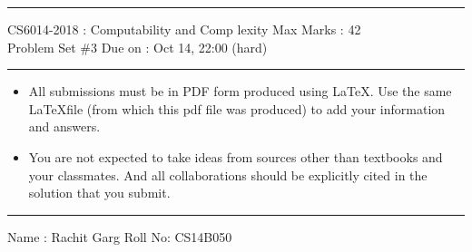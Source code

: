 \documentclass[solution,addpoints,12pt]{exam}
\begin{document}
\hrule
\vspace{3mm}
\noindent 
{\sf CS6014-2018 : Computability and Comp lexity  \hfill Max Marks : 42}
\vspace{3mm}\\
\noindent 
{\sf Problem Set \#3 \hfill Due on : Oct 14, 22:00 (hard)}
\vspace{3mm}
\hrule
{\small
\begin{itemize}
\item All submissions must be in PDF form produced using \LaTeX. Use the same \LaTeX file (from which this pdf file was produced) to add your information and answers.
\item You are not expected to take ideas from sources other than textbooks and your classmates. And all collaborations should be explicitly cited in the solution that you submit.
\end{itemize}}
\hrule
\vspace{3mm}
{\sf Name : Rachit Garg \hfill Roll No: CS14B050}
\vspace{3mm}
\end{document}
